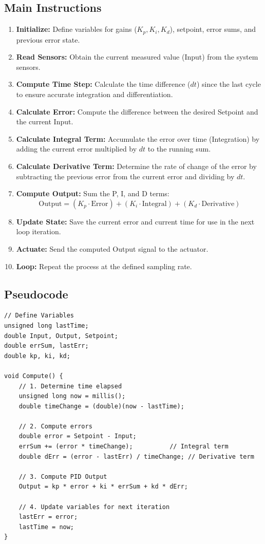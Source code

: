 \documentclass[a4paper,12pt]{article}
\begin{document}
\subsection*{Main Instructions}
\begin{enumerate}
    \item \textbf{Initialize:} Define variables for gains ($K_p, K_i, K_d$), setpoint, error sums, and previous error state.
    \item \textbf{Read Sensors:} Obtain the current measured value (Input) from the system sensors.
    \item \textbf{Compute Time Step:} Calculate the time difference ($dt$) since the last cycle to ensure accurate integration and differentiation.
    \item \textbf{Calculate Error:} Compute the difference between the desired Setpoint and the current Input.
    \item \textbf{Calculate Integral Term:} Accumulate the error over time (Integration) by adding the current error multiplied by $dt$ to the running sum.
    \item \textbf{Calculate Derivative Term:} Determine the rate of change of the error by subtracting the previous error from the current error and dividing by $dt$.
    \item \textbf{Compute Output:} Sum the P, I, and D terms:
    \[ \text{Output} = (K_p \cdot \text{Error}) + (K_i \cdot \text{Integral}) + (K_d \cdot \text{Derivative}) \]
    \item \textbf{Update State:} Save the current error and current time for use in the next loop iteration.
    \item \textbf{Actuate:} Send the computed Output signal to the actuator.
    \item \textbf{Loop:} Repeat the process at the defined sampling rate.
\end{enumerate}

\subsection*{Pseudocode}
\begin{verbatim}
// Define Variables
unsigned long lastTime;
double Input, Output, Setpoint;
double errSum, lastErr;
double kp, ki, kd;

void Compute() {
    // 1. Determine time elapsed
    unsigned long now = millis();
    double timeChange = (double)(now - lastTime);

    // 2. Compute errors
    double error = Setpoint - Input;
    errSum += (error * timeChange);          // Integral term
    double dErr = (error - lastErr) / timeChange; // Derivative term

    // 3. Compute PID Output
    Output = kp * error + ki * errSum + kd * dErr;

    // 4. Update variables for next iteration
    lastErr = error;
    lastTime = now;
}
\end{verbatim}
\end{document}
